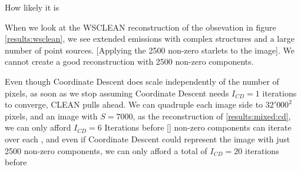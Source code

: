 How likely it is

When we look at the WSCLEAN reconstruction of the obsevation in figure \ref{results:wsclean}, we see extended emissions with complex structures and a large number of point sources. [Applying the 2500 non-zero starlets to the image]. We cannot create a good reconstruction with 2500 non-zero components.

Even though Coordinate Descent does scale independently of the number of pixels, as soon as we stop assuming Coordinate Descent needs $I_{CD} = 1$ iterations to converge, CLEAN pulls ahead. We can quadruple each image side to $32'000^2$ pixels, and an image with $S=7000$, as the reconstruction of \ref{results:mixed:cd}, we can only afford $I_{CD} = 6$ Iterations before \ref{} non-zero components can iterate over each , and even if Coordinate Descent could represent the image with just 2500 non-zero components, we can only afford a total of $I_{CD} = 20$ iterations before



